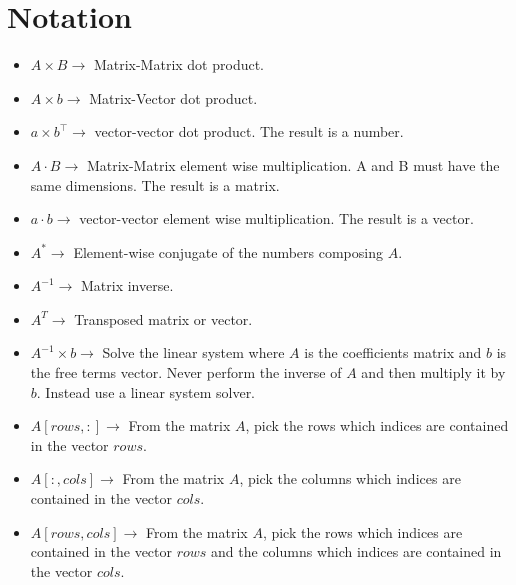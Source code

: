 \documentclass[a4paper,twoside]{tufte-book}
\begin{document}
\chapter{Notation}
\begin{fullwidth}

\begin{multicols}{2}

\begin{itemize}
	
	\item $A \times B \rightarrow$ Matrix-Matrix dot product.
	
	\item $A \times b \rightarrow$ Matrix-Vector dot product.
	
	\item $a \times b^\top \rightarrow$ vector-vector dot product. The result is a number.
	
	\item $A \cdot B \rightarrow$ Matrix-Matrix element wise multiplication. A and B must have the same dimensions. The result is a matrix.
	
	\item $a \cdot b \rightarrow$ vector-vector element wise multiplication. The result is a vector.
	
	\item $A^{*}\rightarrow$ Element-wise conjugate of the numbers composing $A$.
	
	\item $A^{-1}\rightarrow$ Matrix inverse.
	
	\item $A^{T}\rightarrow$ Transposed matrix or vector.
	
	\item $A^{-1} \times b \rightarrow$ Solve the linear system where $A$ is the coefficients matrix and $b$ is the free terms vector. Never perform the inverse of $A$ and then multiply it by $b$. Instead use a linear system solver.
	
	\item $A[rows, :] \rightarrow$ From the matrix $A$, pick the rows which indices are contained in the vector $rows$.
	
	
	\item $A[:, cols] \rightarrow$ From the matrix $A$, pick the columns which indices are contained in the vector  $cols$.
	
	
	\item $A[rows, cols] \rightarrow$ From the matrix $A$, pick the rows which indices are contained in the vector  $rows$ and the columns which indices are contained in the vector  $cols$.
	

\end{itemize}
\end{multicols}
\end{fullwidth}
\end{document}
